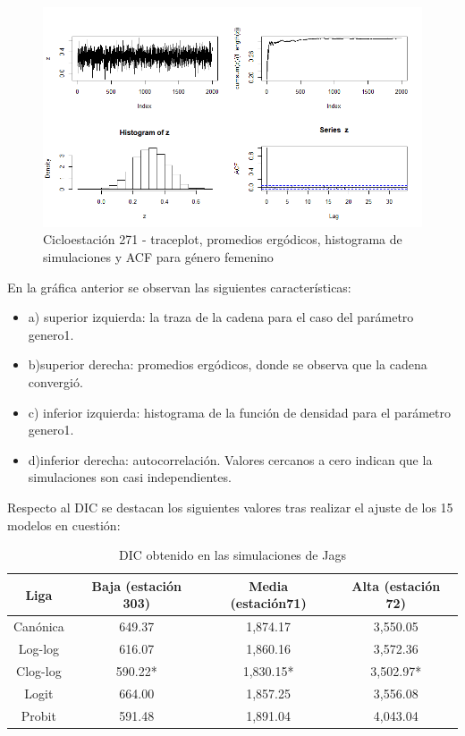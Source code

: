 \documentclass[9pt,twocolumn,twoside]{ilcss}
\begin{document}
\begin{figure}[tbhp]
	\centering
	\includegraphics[width=0.9\linewidth]{Paper/images/271_genero_1mujer.png}
	\caption{ Cicloestación 271 - traceplot, promedios ergódicos, histograma de simulaciones y ACF para género femenino}
	\label{fig:pen_habs_penb271gen1}
\end{figure}
\newpage

En la gráfica anterior se observan las siguientes características:
\begin {itemize}
\item a) superior izquierda: la traza de la cadena para el caso del parámetro genero1. \item b)superior derecha: promedios ergódicos, donde se observa que la cadena convergió.
\item c) inferior izquierda: histograma de la función de densidad para el parámetro genero1.
\item d)inferior derecha: autocorrelación. Valores cercanos a cero indican que la simulaciones son casi independientes. 
\end {itemize}

Respecto al DIC se destacan los siguientes valores tras realizar el ajuste de los 15 modelos en cuestión:

\begin{table}[tbhp]
\centering
\caption{DIC obtenido en las simulaciones de Jags}
\label{tab:dic}
\begin{tabular}{@{}cccc@{}}
\toprule
Liga & Baja (estación 303) & Media (estación71) & Alta (estación 72) \\ \midrule
Canónica & 649.37 & 1,874.17 & 3,550.05 \\
Log-log & 616.07 & 1,860.16 & 3,572.36 \\
Clog-log & 590.22* & 1,830.15* &  3,502.97* \\
Logit & 664.00 & 1,857.25 & 3,556.08 \\
Probit & 591.48 & 1,891.04 & 4,043.04 \\ \bottomrule
\end{tabular}
\end{table}
\end{document}
